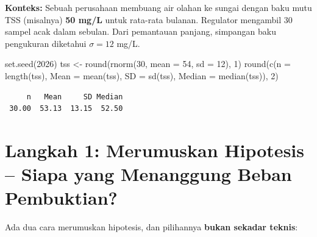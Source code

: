 \documentclass[
  indonesian,
  letterpaper,
]{book}
\newenvironment{Shaded}{\begin{snugshade}}{\end{snugshade}}
\newcommand{\AttributeTok}[1]{\textcolor[rgb]{0.40,0.45,0.13}{#1}}
\newcommand{\DecValTok}[1]{\textcolor[rgb]{0.68,0.00,0.00}{#1}}
\newcommand{\FunctionTok}[1]{\textcolor[rgb]{0.28,0.35,0.67}{#1}}
\newcommand{\NormalTok}[1]{\textcolor[rgb]{0.00,0.23,0.31}{#1}}
\newcommand{\OtherTok}[1]{\textcolor[rgb]{0.00,0.23,0.31}{#1}}
\begin{document}
\textbf{Konteks:} Sebuah perusahaan membuang air olahan ke sungai dengan
baku mutu TSS (misalnya) \textbf{50 mg/L} untuk rata-rata bulanan.
Regulator mengambil 30 sampel acak dalam sebulan. Dari pemantauan
panjang, simpangan baku pengukuran diketahui \(\sigma = 12\) mg/L.

\begin{Shaded}
\begin{Highlighting}[]
\FunctionTok{set.seed}\NormalTok{(}\DecValTok{2026}\NormalTok{)}
\NormalTok{tss }\OtherTok{\textless{}{-}} \FunctionTok{round}\NormalTok{(}\FunctionTok{rnorm}\NormalTok{(}\DecValTok{30}\NormalTok{, }\AttributeTok{mean =} \DecValTok{54}\NormalTok{, }\AttributeTok{sd =} \DecValTok{12}\NormalTok{), }\DecValTok{1}\NormalTok{)}
\FunctionTok{round}\NormalTok{(}\FunctionTok{c}\NormalTok{(}\AttributeTok{n =} \FunctionTok{length}\NormalTok{(tss), }\AttributeTok{Mean =} \FunctionTok{mean}\NormalTok{(tss), }\AttributeTok{SD =} \FunctionTok{sd}\NormalTok{(tss), }\AttributeTok{Median =} \FunctionTok{median}\NormalTok{(tss)), }\DecValTok{2}\NormalTok{)}
\end{Highlighting}
\end{Shaded}

\begin{verbatim}
     n   Mean     SD Median 
 30.00  53.13  13.15  52.50 
\end{verbatim}

\section{Langkah 1: Merumuskan Hipotesis -- Siapa yang Menanggung Beban
Pembuktian?}\label{langkah-1-merumuskan-hipotesis-siapa-yang-menanggung-beban-pembuktian}

Ada dua cara merumuskan hipotesis, dan pilihannya \textbf{bukan sekadar
teknis}:
\end{document}
